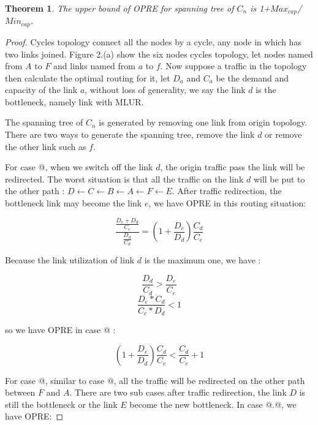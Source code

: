 \documentclass[conference]{IEEEtran}
\makeatletter
\newcommand{\Rmnum}[1]{\expandafter\@slowromancap\romannumeral #1@}
\newtheorem{theorem}{Theorem}
\makeatother
\begin{document}
\begin{theorem}
The upper bound of OPRE for spanning tree of $C_n$ is 1+$Max_{cap}$/$Min_{cap}$.
\end{theorem}

\begin{proof}
Cycles topology connect all the nodes by a cycle, any node in which has two links joined. Figure 2.(a) show the six
nodes cycles topology, let nodes named from $A$ to $F$ and links named from $a$ to $f$. Now suppose a traffic in the 
topology then calculate the optimal routing for it, let $D_a$ and $C_a$ be the demand and capacity of the link $a$, 
without loss of generality, we say the link $d$ is the bottleneck, namely link with MLUR. 

The spanning tree of $C_n$ is generated by removing one link from origin topology. There are two ways to generate 
the spanning tree, remove the link $d$ or remove the other link such as $f$.

For case \Rmnum{1}, when we switch off the link $d$, the origin traffic pass the link will be redirected. The worst situation
is that all the traffic on the link $d$ will be put to the other path : $D \leftarrow C \leftarrow B \leftarrow A \leftarrow 
F \leftarrow E$. After traffic redirection, the bottleneck link may become the link $e$, we have OPRE in this routing situation:

\begin{equation}
    \frac {\frac{D_e + D_d} {C_e}} {\frac {D_d}{C_d}} = (1 + \frac{D_e}{D_d}) \frac{C_d}{C_e}
\end{equation}

Because the link utilization of link $d$ is the maximum one, we have :

\begin{equation}
    \frac{D_d}{C_d} > \frac{D_e}{C_e} 
\end{equation}
\begin{equation}
    \frac{D_e * C_d}{C_e * D_d} < 1
\end{equation}

so we have OPRE in case \Rmnum{1} :

\begin{equation}
    (1 + \frac{D_e}{D_d}) \frac{C_d}{C_e} < \frac{C_d}{C_e} + 1
\end{equation}


For case \Rmnum{2}, similar to case \Rmnum{1}, all the traffic will be redirected on the other path between $F$ and $A$. There are two 
sub cases after traffic redirection, the link $D$ is still the bottleneck or the link $E$ become the new bottleneck. In case \Rmnum{2}.\Rmnum{1},
we have OPRE:


\end{proof}
\end{document}
